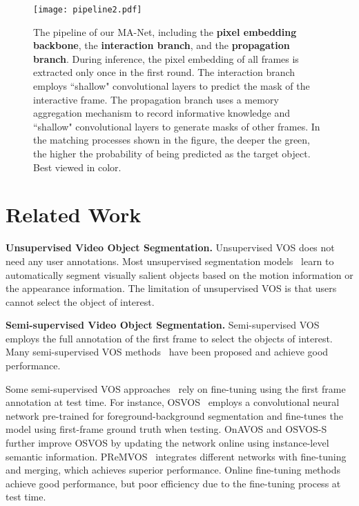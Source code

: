 \documentclass[10pt,twocolumn,letterpaper]{article}
\begin{document}
\begin{figure*}[t]
\texttt{[image: pipeline2.pdf]}
\centering
\caption{The pipeline of our MA-Net, including the \textbf{pixel embedding backbone}, the \textbf{interaction branch}, and the \textbf{propagation branch}. During inference, the pixel embedding of all frames is extracted only once in the first round. The interaction branch employs ``shallow" convolutional layers to predict the mask of the interactive frame. The propagation branch uses a memory aggregation mechanism to record informative knowledge and ``shallow" convolutional layers to generate masks of other frames. In the matching processes shown in the figure, the deeper the green, the higher the probability of being predicted as the target object. Best viewed in color.}
\vspace{-3mm}
\label{fig:pipeline}
\end{figure*}
%
 \section{Related Work}
\noindent \textbf{Unsupervised Video Object Segmentation.}
Unsupervised VOS does not need any user annotations. Most unsupervised segmentation models~\cite{ventura2019rvos,wang2019learning} learn to automatically segment visually salient objects based on the motion information or the appearance information. 
The limitation of unsupervised VOS is that users cannot select the object of interest.

\noindent\textbf{Semi-supervised Video Object Segmentation.}
Semi-supervised VOS employs the full annotation of the first frame to select the objects of interest. Many semi-supervised VOS methods~\cite{chen2018blazingly,hu2018videomatch,voigtlaender2019feelvos,wug2018fast,oh2019video,xu2019mhp,caelles2017one,voigtlaender2017online,maninis2018video,yang2018efficient,yang2020collaborative} have been proposed and achieve good performance. 


Some semi-supervised VOS approaches~\cite{caelles2017one,voigtlaender2017online,li2018video,luiten2018premvos} rely on fine-tuning using the first frame annotation at test time. For instance, OSVOS~\cite{caelles2017one} employs a convolutional neural network pre-trained for foreground-background segmentation and fine-tunes the model using first-frame ground truth when testing. OnAVOS\cite{voigtlaender2017online} and OSVOS-S~\cite{maninis2018video} further improve OSVOS by updating the network online using instance-level semantic information. 
PReMVOS~\cite{luiten2018premvos} integrates different networks with fine-tuning and merging, which achieves superior performance. Online fine-tuning methods achieve good performance, but poor efficiency due to the fine-tuning process at test time.
\end{document}
